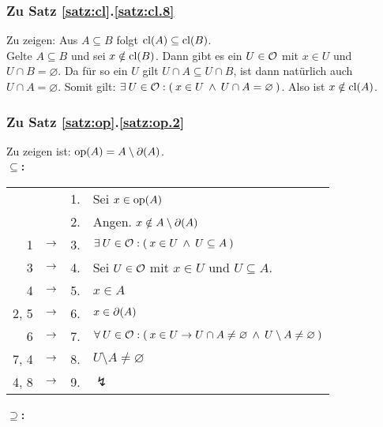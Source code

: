 \subsubsection{Zu Satz \ref{satz:cl}.\ref{satz:cl.8}} \label{anh:cl.8}
    Zu zeigen: Aus ${A \subseteq B}$ folgt ${\text{cl}(A) \subseteq \text{cl}(B)}$.\\
    Gelte ${A \subseteq B}$ und sei ${x \notin \text{cl}(B)}$. Dann gibt es ein ${U \in \mathcal{O}}$ mit ${x \in U}$ und ${U \cap B = \varnothing}$. Da für so ein $U$ gilt ${U \cap A \subseteq U \cap B}$, ist dann natürlich auch ${U \cap A = \varnothing}$. Somit gilt: ${\exists\: U \in \mathcal{O} : (\: x \in U \:\land\: U \cap A = \varnothing \:)}$. Also ist ${x \notin \text{cl}(A)}$.

    

\subsubsection{Zu Satz \ref{satz:op}.\ref{satz:op.2}}\label{anh:op.2}
    Zu zeigen ist: $\text{op}(A) = A \setminus \partial(A)$.\\

    \noindent
    \textbf{\glqq$\boldsymbol{\subseteq}$\grqq:}

        \begin{longtable}{r c c l}
            & & 1. & Sei $x \in \text{op}(A)$ \\
            & & 2. & Angen. $x \notin A \setminus \partial(A)$ \\
            1 & $\rightarrow$ & 3. & $\exists\: U \in \mathcal{O} : (\: x \in U \:\land\: U \subseteq A \:)$ \\
            3 & $\rightarrow$ & 4. & Sei $U \in \mathcal{O}$ mit $x \in U$ und $U \subseteq A$. \\
            4 & $\rightarrow$ & 5. & $x \in A$ \\
            2, 5 & $\rightarrow$ & 6. & $x \in \partial(A)$ \\
            6 & $\rightarrow$ & 7. & $\forall\: U \in \mathcal{O} : (\: x \in U \to U \cap A \neq \varnothing \:\land\: U \setminus A \neq \varnothing \:)$ \\
            7, 4 & $\rightarrow$ & 8. & $U \setminus A \neq \varnothing$ \\
            4, 8 & $\rightarrow$ & 9. & $\lightning$ 
        \end{longtable}	

    \noindent
    \textbf{\glqq$\boldsymbol{\supseteq}$\grqq:}

